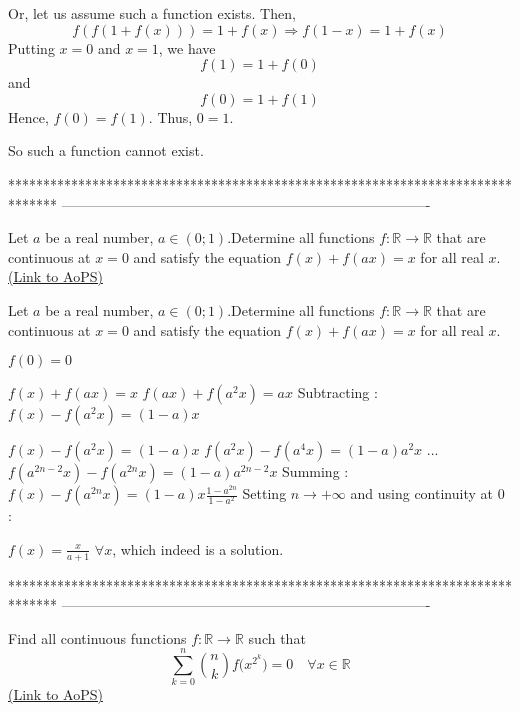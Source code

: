 \begin{solution}
	Or,
let us assume such a function exists.
Then, \[f(f(1+f(x)))=1+f(x)\Rightarrow f(1-x)=1+f(x)\]
Putting $x=0$ and $x=1$, we have \[f(1)=1+f(0)\] and \[f(0)=1+f(1)\]
Hence, $f(0)=f(1)$.
Thus, $0=1$.

So such a function cannot exist.
\end{solution}
*******************************************************************************
-------------------------------------------------------------------------------

\begin{problem}
	Let $a$ be a real number, $a{\in}(0;1)$.Determine all functions $f: \mathbb{R}\to\mathbb{R}$ that are continuous at $x=0$ and satisfy the equation $f(x)+f(ax)=x$ for all real $x$.
	\flushright \href{https://artofproblemsolving.com/community/c6h565063}{(Link to AoPS)}
\end{problem}



\begin{solution}
	\begin{tcolorbox}Let $a$ be a real number, $a{\in}(0;1)$.Determine all functions $f: \mathbb{R}\to\mathbb{R}$ that are continuous at $x=0$ and satisfy the equation $f(x)+f(ax)=x$ for all real $x$.\end{tcolorbox}
$f(0)=0$

$f(x)+f(ax)=x$
$f(ax)+f(a^2x)=ax$
Subtracting : $f(x)-f(a^2x)=(1-a)x$

$f(x)-f(a^2x)=(1-a)x$
$f(a^2x)-f(a^4x)=(1-a)a^2x$
...
$f(a^{2n-2}x)-f(a^{2n}x)=(1-a)a^{2n-2}x$
Summing : $f(x)-f(a^{2n}x)=(1-a)x\frac{1-a^{2n}}{1-a^2}$
Setting $n\to+\infty$ and using continuity at $0$ :

$\boxed{f(x)=\frac x{a+1}}$ $\forall x$, which indeed is a solution.
\end{solution}
*******************************************************************************
-------------------------------------------------------------------------------

\begin{problem}
	Find all continuous functions $f: \mathbb{R} \to \mathbb{R}$ such that
      \[\sum_{k=0}^{n}{{n\choose k} f(x^{2^{k}}})=0 \quad \forall x\in \mathbb{R} \]
	\flushright \href{https://artofproblemsolving.com/community/c6h565080}{(Link to AoPS)}
\end{problem}



